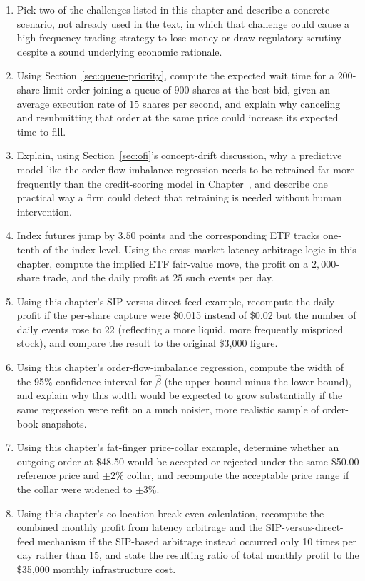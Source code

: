 \documentclass[../ai_in_finance]{subfiles}
\begin{document}
\begin{enumerate}[exercises]
    \item Pick two of the challenges listed in this chapter and describe a concrete scenario, not already used in the text, in which that challenge could cause a high-frequency trading strategy to lose money or draw regulatory scrutiny despite a sound underlying economic rationale.
    \item Using Section~\ref{sec:queue-priority}, compute the expected wait time for a $200$-share limit order joining a queue of $900$ shares at the best bid, given an average execution rate of $15$ shares per second, and explain why canceling and resubmitting that order at the same price could increase its expected time to fill.
    \item Explain, using Section~\ref{sec:ofi}'s concept-drift discussion, why a predictive model like the order-flow-imbalance regression needs to be retrained far more frequently than the credit-scoring model in Chapter~, and describe one practical way a firm could detect that retraining is needed without human intervention.
    \item Index futures jump by $3.50$ points and the corresponding ETF tracks one-tenth of the index level. Using the cross-market latency arbitrage logic in this chapter, compute the implied ETF fair-value move, the profit on a $2{,}000$-share trade, and the daily profit at $25$ such events per day.
    \item Using this chapter's SIP-versus-direct-feed example, recompute the daily profit if the per-share capture were \$0.015 instead of \$0.02 but the number of daily events rose to 22 (reflecting a more liquid, more frequently mispriced stock), and compare the result to the original \$3,000 figure.
    \item Using this chapter's order-flow-imbalance regression, compute the width of the 95\% confidence interval for $\hat\beta$ (the upper bound minus the lower bound), and explain why this width would be expected to grow substantially if the same regression were refit on a much noisier, more realistic sample of order-book snapshots.
    \item Using this chapter's fat-finger price-collar example, determine whether an outgoing order at \$48.50 would be accepted or rejected under the same \$50.00 reference price and $\pm2\%$ collar, and recompute the acceptable price range if the collar were widened to $\pm3\%$.
    \item Using this chapter's co-location break-even calculation, recompute the combined monthly profit from latency arbitrage and the SIP-versus-direct-feed mechanism if the SIP-based arbitrage instead occurred only 10 times per day rather than 15, and state the resulting ratio of total monthly profit to the \$35,000 monthly infrastructure cost.

\end{enumerate}
\end{document}
